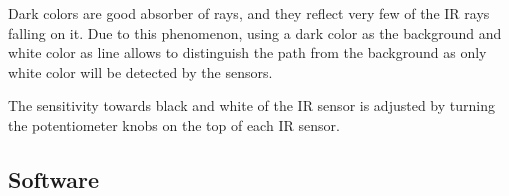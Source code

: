 \begin{enumerate}[topsep=-2pt, itemsep=6mm]
			
			Dark colors are good absorber of rays, and they reflect very few of the IR rays falling on it. Due to this phenomenon, using a dark color as the background and white color as line allows to distinguish the path from the background as only white color will be detected by the sensors. 
			
			
			The sensitivity towards black and white of the IR sensor is adjusted by turning the potentiometer knobs on the top of each IR sensor.

	\end{enumerate}
	
	
	
	
	
	
	
	\subsection{Software}
	
